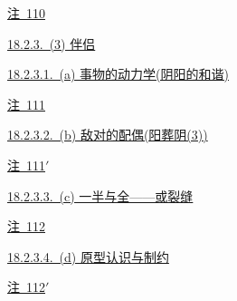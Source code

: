 \par\noindent\hspace*{4.05em}\hyperref[ch18:local:n10]{注~110}\nobreak\dotfill\nobreak\hyperref[ch18:local:n10]{\pageref*{ch18:local:n10}}\par
\par\noindent\hspace*{1.35em}\hyperref[ch18:local:h11]{18.2.3.~(3) 伴侣}\nobreak\dotfill\nobreak\hyperref[ch18:local:h11]{\pageref*{ch18:local:h11}}\par
\par\noindent\hspace*{2.70em}\hyperref[ch18:local:h12]{18.2.3.1.~(a) 事物的动力学(阴阳的和谐)}\nobreak\dotfill\nobreak\hyperref[ch18:local:h12]{\pageref*{ch18:local:h12}}\par
\par\noindent\hspace*{4.05em}\hyperref[ch18:local:n11]{注~111}\nobreak\dotfill\nobreak\hyperref[ch18:local:n11]{\pageref*{ch18:local:n11}}\par
\par\noindent\hspace*{2.70em}\hyperref[ch18:local:h13]{18.2.3.2.~(b) 敌对的配偶(阳葬阴(3))}\nobreak\dotfill\nobreak\hyperref[ch18:local:h13]{\pageref*{ch18:local:h13}}\par
\par\noindent\hspace*{4.05em}\hyperref[ch18:local:n12]{注~111$'$}\nobreak\dotfill\nobreak\hyperref[ch18:local:n12]{\pageref*{ch18:local:n12}}\par
\par\noindent\hspace*{2.70em}\hyperref[ch18:local:h14]{18.2.3.3.~(c) 一半与全——或裂缝}\nobreak\dotfill\nobreak\hyperref[ch18:local:h14]{\pageref*{ch18:local:h14}}\par
\par\noindent\hspace*{4.05em}\hyperref[ch18:local:n13]{注~112}\nobreak\dotfill\nobreak\hyperref[ch18:local:n13]{\pageref*{ch18:local:n13}}\par
\par\noindent\hspace*{2.70em}\hyperref[ch18:local:h15]{18.2.3.4.~(d) 原型认识与制约}\nobreak\dotfill\nobreak\hyperref[ch18:local:h15]{\pageref*{ch18:local:h15}}\par
\par\noindent\hspace*{4.05em}\hyperref[ch18:local:n14]{注~112$'$}\nobreak\dotfill\nobreak\hyperref[ch18:local:n14]{\pageref*{ch18:local:n14}}\par
